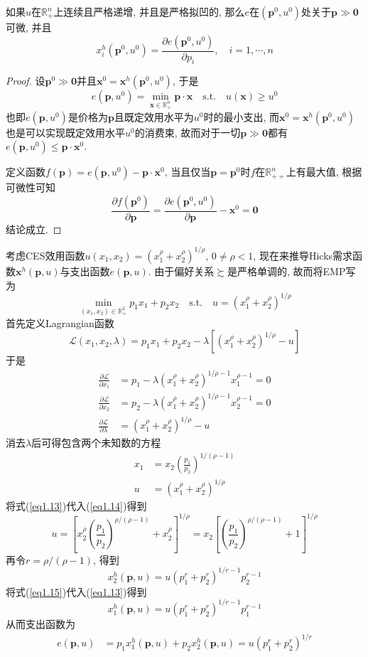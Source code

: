 \documentclass[cn, 12pt, math=mtpro2, bibstyle=apa, blue, twocol]{elegantbook}
\newcommand{\R}{\mathbb{R}}
\newcommand{\p}{\mathbf{p}}
\newcommand{\x}{\mathbf{x}}
\begin{document}
\begin{theorem}[Shephard引理]
  如果$u$在$\R_+^n$上连续且严格递增, 并且是严格拟凹的, 那么$e$在$(\p^0,u^0)$处关于$\p\gg\mathbf{0}$可微, 并且
  $$x_i^h(\p^0,u^0)=\frac{\partial e(\p^0,u^0)}{\partial p_i},\quad i=1,\cdots,n$$
\end{theorem}
\begin{proof}
  设$\p^0\gg\mathbf{0}$并且$\x^0=\x^h(\p^0,u^0)$, 于是
  $$e(\p,u^0)=\min_{\x\in\R_+^n}\p\cdot\x\quad\text{s.t.}\quad u(\x)\ge u^0$$
  也即$e(\p,u^0)$是价格为$\p$且既定效用水平为$u^0$时的最小支出, 而$\x^0=\x^h(\p^0,u^0)$也是可以实现既定效用水平$u^0$的消费束, 故而对于一切$\p\gg\mathbf{0}$都有$e(\p,u^0)\leq \p\cdot\x^0$.

  定义函数$f(\p)=e(\p,u^0)-\p\cdot\x^0$, 当且仅当$\p=\p^0$时$f$在$\R_{++}^n$上有最大值, 根据可微性可知
  $$\frac{\partial f(\p^0)}{\partial \p}=\frac{\partial e(\p^0,u^0)}{\partial \p}-\x^0=\mathbf{0}$$
  结论成立.
\end{proof}
\begin{example}
考虑CES效用函数$u(x_1,x_2)=(x_1^\rho+x_2^\rho)^{1/\rho}$, $0\neq\rho<1$, 现在来推导Hicks需求函数$\x^h(\p,u)$与支出函数$e(\p,u)$. 由于偏好关系$\succsim$是严格单调的, 故而将EMP写为
$$\min_{(x_1,x_2)\in\R_+^2}p_1x_1+p_2x_2\quad\text{s.t.}\quad u=(x_1^\rho+x_2^\rho)^{1/\rho}$$
首先定义Lagrangian函数
$$\mathcal{L}(x_1,x_2,\lambda)=p_1x_1+p_2x_2-\lambda[(x_1^\rho+x_2^\rho)^{1/\rho}-u]$$
于是
\begin{align*}
\frac{\partial\mathcal{L}}{\partial x_1}&=p_1-\lambda(x_1^\rho+x_2^\rho)^{1/\rho-1}x_1^{\rho-1}=0 \\
\frac{\partial\mathcal{L}}{\partial x_2}&=p_2-\lambda(x_1^\rho+x_2^\rho)^{1/\rho-1}x_2^{\rho-1}=0 \\
\frac{\partial\mathcal{L}}{\partial\lambda}&=(x_1^\rho+x_2^\rho)^{1/\rho}-u
\end{align*}
消去$\lambda$后可得包含两个未知数的方程
\begin{align}
x_1&=x_2\left(\frac{p_1}{p_2}\right)^{1/(\rho-1)} \label{eq1.13} \\
u&=(x_1^\rho+x_2^\rho)^{1/\rho} \label{eq1.14}
\end{align}
将式(\ref{eq1.13})代入(\ref{eq1.14})得到
$$  u=\left[x_2^\rho\left(\frac{p_1}{p_2}\right)^{\rho/(\rho-1)}+x_2^\rho\right]^{1/\rho}=x_2\left[\left(\frac{p_1}{p_2}\right)^{\rho/(\rho-1)}+1\right]^{1/\rho}
$$
再令$r=\rho/(\rho-1)$, 得到
\begin{equation}\label{eq1.15}
  x_2^h(\p,u)=u(p_1^r+p_2^r)^{1/r-1}p_2^{r-1}
\end{equation}
将式(\ref{eq1.15})代入(\ref{eq1.13})得到
$$  x_1^h(\p,u)=u(p_1^r+p_2^r)^{1/r-1}p_1^{r-1}
$$
从而支出函数为
\begin{align*}
e(\p,u)&=p_1x_1^h(\p,u)+p_2x_2^h(\p,u)=u(p_1^r+p_2^r)^{1/r}
\end{align*}
\end{example}
\end{document}
